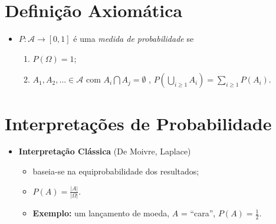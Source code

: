 \documentclass[
]{book}
\providecommand{\tightlist}{%
  \setlength{\itemsep}{0pt}\setlength{\parskip}{0pt}}
\begin{document}
\hypertarget{definiuxe7uxe3o-axiomuxe1tica}{%
\section{Definição Axiomática}\label{definiuxe7uxe3o-axiomuxe1tica}}

\begin{itemize}
\tightlist
\item
  \(P: \mathcal{A} \longrightarrow [0,1]\) é uma \emph{medida de probabilidade} se

  \begin{enumerate}
  \def\labelenumi{\arabic{enumi}.}
  \tightlist
  \item
    \(P(\Omega) = 1\);
  \item
    \(\displaystyle A_1, A_2, \ldots \in \mathcal{A}\) com \(A_i \bigcap A_j = \emptyset\) , \(\displaystyle P\left(\bigcup_{i \geq 1} A_i\right) = \sum_{i \geq 1} P\left(A_i\right)\).
  \end{enumerate}
\end{itemize}

\hypertarget{interpretauxe7uxf5es-de-probabilidade}{%
\section{Interpretações de Probabilidade}\label{interpretauxe7uxf5es-de-probabilidade}}

\begin{itemize}
\tightlist
\item
  \textbf{Interpretação Clássica} (De Moivre, Laplace)

  \begin{itemize}
  \tightlist
  \item
    baseia-se na equiprobabilidade dos resultados;
  \item
    \(P(A) = \frac{|A|}{|\Omega|}\).
  \item
    \textbf{Exemplo:} um lançamento de moeda, \(A\) = ``cara'', \(P(A) = \frac{1}{2}\).
  \end{itemize}
\end{itemize}

\(~\)
\end{document}
